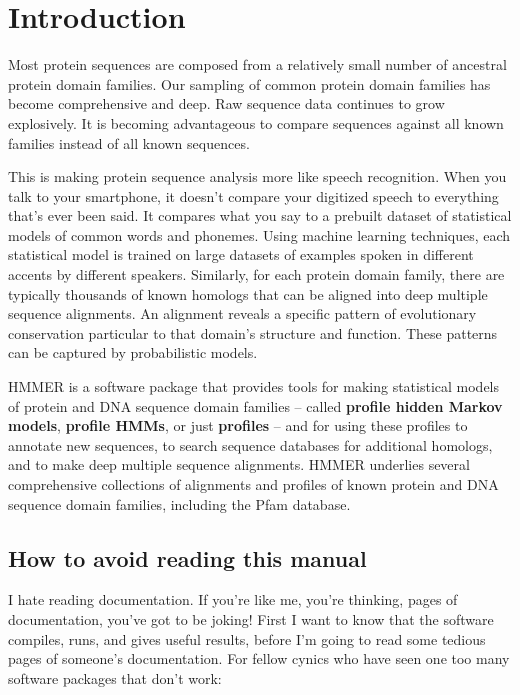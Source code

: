\newpage
\chapter{Introduction}
\label{chapter:introduction}
\setcounter{footnote}{0}

Most protein sequences are composed from a relatively small number of
ancestral protein domain families. Our sampling of common protein
domain families has become comprehensive and deep. Raw sequence data
continues to grow explosively. It is becoming advantageous to compare
sequences against all known families instead of all known sequences.

This is making protein sequence analysis more like speech recognition.
When you talk to your smartphone, it doesn't compare your digitized
speech to everything that's ever been said. It compares what you say
to a prebuilt dataset of statistical models of common words and
phonemes.  Using machine learning techniques, each statistical model
is trained on large datasets of examples spoken in different accents
by different speakers. Similarly, for each protein domain family,
there are typically thousands of known homologs that can be aligned
into deep multiple sequence alignments. An alignment reveals a
specific pattern of evolutionary conservation particular to that
domain's structure and function. These patterns can be captured by
probabilistic models.

HMMER is a software package that provides tools for making statistical
models of protein and DNA sequence domain families -- called
\textbf{profile hidden Markov models}, \textbf{profile HMMs}, or just
\textbf{profiles} -- and for using these profiles to annotate new
sequences, to search sequence databases for additional homologs, and
to make deep multiple sequence alignments.  HMMER underlies several
comprehensive collections of alignments and profiles of known protein
and DNA sequence domain families, including the Pfam
database.


\section{How to avoid reading this manual}

I hate reading documentation. If you're like me, you're thinking,
\pageref*{manualend} pages of documentation, you've got to be joking!
First I want to know that the software compiles, runs, and gives
useful results, before I'm going to read some \pageref*{manualend}
tedious pages of someone's documentation. For fellow cynics who have
seen one too many software packages that don't work:

